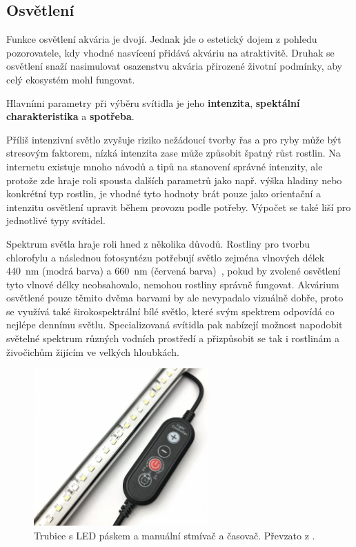     \subsection{Osvětlení}
        Funkce osvětlení akvária je dvojí. Jednak jde o estetický dojem z pohledu pozorovatele, kdy vhodné nasvícení přidává akváriu na atraktivitě. Druhak se osvětlení snaží nasimulovat osazenstvu akvária přirozené životní podmínky, aby celý ekosystém mohl fungovat.

        Hlavními parametry při výběru svítidla je jeho \textbf{intenzita}, \textbf{spektální charakteristika} a \textbf{spotřeba}. 
        
        Příliš intenzivní světlo zvyšuje riziko nežádoucí tvorby řas a pro ryby může být stresovým faktorem, nízká intenzita zase může způsobit špatný růst rostlin. Na internetu existuje mnoho návodů a tipů na stanovení správné intenzity, ale protože zde hraje roli spousta dalších parametrů jako např. výška hladiny nebo konkrétní typ rostlin, je vhodné tyto hodnoty brát pouze jako orientační a intenzitu osvětlení upravit během provozu podle potřeby. Výpočet se také liší pro jednotlivé typy svítidel. 

        Spektrum světla hraje roli hned z několika důvodů. Rostliny pro tvorbu chlorofylu a následnou fotosyntézu potřebují světlo zejména vlnových délek \qty{440}{nm} (modrá barva) a \qty{660}{nm} (červená barva)~\cite{eshop-ledsolution-svetlo}, pokud by zvolené osvětlení tyto vlnové délky neobsahovalo, nemohou rostliny správně fungovat. Akvárium osvětlené pouze těmito dvěma barvami by ale nevypadalo vizuálně dobře, proto se využívá také širokospektrální bílé světlo, které svým spektrem odpovídá co nejlépe dennímu světlu. 
        Specializovaná svítidla pak nabízejí možnost napodobit světelné spektrum různých vodních prostředí a přizpůsobit se tak i rostlinám a živočichům žijícím ve velkých hloubkách. 

        \begin{figure}[h!]
            \centering
            \includegraphics[width=0.6\textwidth]{obrazky/osvetleni/stmivac.jpg}
            \caption{Trubice s LED páskem a manuální stmívač a časovač. Převzato z \cite{eshop-rostlinna-akvaria}.}
            \label{fig:obrazky-osvetleni-stmivac-jpg}
        \end{figure}

